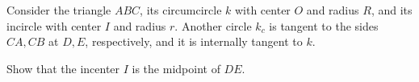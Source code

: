 Consider the triangle $ABC$, its circumcircle $k$ with center $O$ and radius $R$, and its incircle with center $I$ and radius $r$. Another circle $k_c$ is tangent to the sides $CA, CB$ at $D, E$, respectively, and it is internally tangent to $k$.

Show that the incenter $I$ is the midpoint of $DE$.
